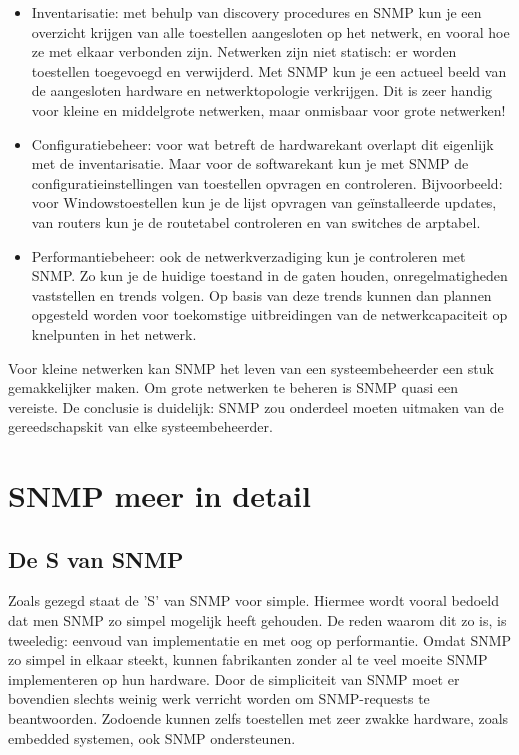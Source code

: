 \begin{itemize}
	\item Inventarisatie: met behulp van discovery procedures en SNMP kun je een overzicht krijgen van alle toestellen aangesloten op het netwerk,
	en vooral hoe ze met elkaar verbonden zijn. Netwerken zijn niet statisch: er worden toestellen toegevoegd en verwijderd. Met SNMP kun je een
	actueel beeld van de aangesloten hardware en netwerktopologie verkrijgen. Dit is zeer handig voor kleine en middelgrote netwerken, maar onmisbaar
	voor grote netwerken!
	
	\item Configuratiebeheer: voor wat betreft de hardwarekant overlapt dit eigenlijk met de inventarisatie. Maar voor de softwarekant kun je met SNMP de
	configuratieinstellingen van toestellen opvragen en controleren. Bijvoorbeeld: voor Windowstoestellen kun je de lijst opvragen van geïnstalleerde updates,
	van routers kun je de routetabel controleren en van switches de \gls{arptabel}.
	
	\item Performantiebeheer: ook de netwerkverzadiging kun je controleren met SNMP. Zo kun je de huidige toestand in de gaten houden,
	onregelmatigheden vaststellen en trends volgen. Op basis van deze trends kunnen dan plannen opgesteld worden voor toekomstige uitbreidingen
	van de netwerkcapaciteit op knelpunten in het netwerk.
\end{itemize}

Voor kleine netwerken kan SNMP het leven van een systeembeheerder een stuk gemakkelijker maken. Om grote netwerken te beheren is SNMP quasi een vereiste.
De conclusie is duidelijk: SNMP zou onderdeel moeten uitmaken van de gereedschapskit van elke systeembeheerder.



\section{SNMP meer in detail}

\subsection{De S van SNMP}

Zoals gezegd staat de 'S' van SNMP voor simple. Hiermee wordt vooral bedoeld dat men SNMP zo simpel mogelijk heeft gehouden.
De reden waarom dit zo is, is tweeledig: eenvoud van implementatie en met oog op performantie. %
Omdat SNMP zo simpel in elkaar steekt, kunnen fabrikanten zonder al te veel moeite SNMP implementeren op hun hardware.
Door de simpliciteit van SNMP moet er bovendien slechts weinig werk verricht worden om SNMP-requests te beantwoorden.
Zodoende kunnen zelfs toestellen met zeer zwakke hardware, zoals embedded systemen, ook SNMP ondersteunen.


